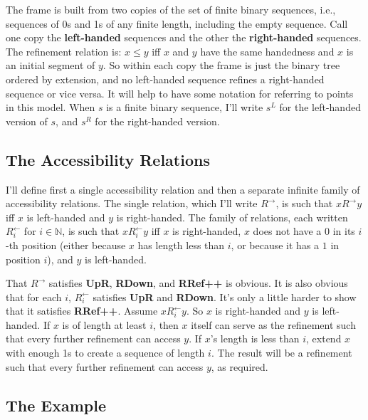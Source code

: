 \documentclass[
  11pt,
  letterpaper,
  DIV=11,
  numbers=noendperiod,
  twoside]{scrartcl}
\begin{document}
The frame is built from two copies of the set of finite binary
sequences, i.e., sequences of 0s and 1s of any finite length, including
the empty sequence. Call one copy the \textbf{left-handed} sequences and
the other the \textbf{right-handed} sequences. The refinement relation
is: \(x \leqslant y\) iff \(x\) and \(y\) have the same handedness and
\(x\) is an initial segment of \(y\). So within each copy the frame is
just the binary tree ordered by extension, and no left-handed sequence
refines a right-handed sequence or vice versa. It will help to have some
notation for referring to points in this model. When \(s\) is a finite
binary sequence, I'll write \(s^L\) for the left-handed version of
\(s\), and \(s^R\) for the right-handed version.

\subsection*{The Accessibility
Relations}\label{the-accessibility-relations}

I'll define first a single accessibility relation and then a separate
infinite family of accessibility relations. The single relation, which
I'll write \(R^{\rightarrow}\), is such that \(xR^{\rightarrow}y\) iff
\(x\) is left-handed and \(y\) is right-handed. The family of relations,
each written \(R^{\leftarrow}_i\) for \(i \in \mathbb{N}\), is such that
\(xR^{\leftarrow}_iy\) iff \(x\) is right-handed, \(x\) does not have a
\(0\) in its \(i\)-th position (either because \(x\) has length less
than \(i\), or because it has a \(1\) in position \(i\)), and \(y\) is
left-handed.

That \(R^{\rightarrow}\) satisfies \textbf{UpR}, \textbf{RDown}, and
\textbf{RRef++} is obvious. It is also obvious that for each \(i\),
\(R^{\leftarrow}_i\) satisfies \textbf{UpR} and \textbf{RDown}. It's
only a little harder to show that it satisfies \textbf{RRef++}. Assume
\(xR^{\leftarrow}_iy\). So \(x\) is right-handed and \(y\) is
left-handed. If \(x\) is of length at least \(i\), then \(x\) itself can
serve as the refinement such that every further refinement can access
\(y\). If \(x\)'s length is less than \(i\), extend \(x\) with enough 1s
to create a sequence of length \(i\). The result will be a refinement
such that every further refinement can access \(y\), as required.

\subsection*{The Example}\label{the-example}
\end{document}
